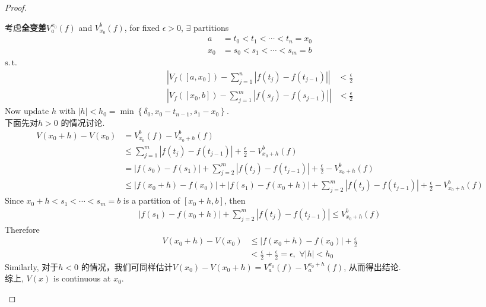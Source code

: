 \begin{proposition}
\begin{proof}
\begin{enumerate}
\begin{itemize}
					\vspace{1em}
					
					考虑\textbf{全变差}$V_{a}^{x_0}(f)$ and $V_{x_0}^{b}(f)$, for fixed $\epsilon > 0$, $\exists$ partitions
					\begin{align}
						a &= t_0 < t_1 < \cdots < t_n = x_0 \\
						x_0 &= s_0 < s_1 < \cdots < s_m = b
					\end{align}
					$\operatorname{s.t.}$
					\begin{align}
						\left| V_{f}([a , x_0]) - \sum_{j = 1}^{n}{\left| f(t_j) - f(t_{j - 1}) \right|} \right| 
						&< \frac{\epsilon}{2} \\
						\left| V_{f}([x_0 , b]) - \sum_{j = 1}^{m}{\left| f(s_j) - f(s_{j - 1}) \right|} \right| 
						&< \frac{\epsilon}{2}
					\end{align}
					Now update $h$ with $\left| h \right| < h_0 = \min{\left\{ \delta_0 , x_0 - t_{n - 1} , s_1 - x_0 \right\}}$. \\
					下面先对$h > 0$ 的情况讨论.
					\begin{align}
						V(x_0 + h) - V(x_0)
						&= V_{x_0}^{b}(f) - V_{x_0 + h}^{b}(f) \\
						&\leq \sum_{j = 1}^{m}{\left| f(t_j) - f(t_{j - 1}) \right|} + \frac{\epsilon}{2} - V_{x_0 + h}^{b}(f) \\
						&= \left| f(s_0) - f(s_1) \right| + \sum_{j = 2}^{m}{\left| f(t_j) - f(t_{j - 1}) \right|} + \frac{\epsilon}{2} - V_{x_0 + h}^{b}(f) \\
						&\leq \left| f(x_0 + h) - f(x_0) \right| + \left| f(s_1) - f(x_0 + h) \right| + \sum_{j = 2}^{m}{\left| f(t_j) - f(t_{j - 1}) \right|} + \frac{\epsilon}{2} - V_{x_0 + h}^{b}(f)
					\end{align}
					Since $x_0 + h < s_1 < \cdots < s_m = b$ is a partition of $[x_0 + h , b]$, then
					\begin{align}
						\left| f(s_1) - f(x_0 + h) \right| + \sum_{j = 2}^{m}{\left| f(t_j) - f(t_{j - 1}) \right|}
						\leq V_{x_0 + h}^{b}(f)
					\end{align}
					Therefore
					\begin{align}
						V(x_0 + h) - V(x_0)
						&\leq \left| f(x_0 + h) - f(x_0) \right| + \frac{\epsilon}{2} \\
						&< \frac{\epsilon}{2} + \frac{\epsilon}{2}
						= \epsilon , \,\, \forall \left| h \right| < h_0
					\end{align}
					Similarly, 对于$h < 0$ 的情况，我们可同样估计$V(x_0) - V(x_0 + h) = V_{a}^{x_0}(f) - V_{a}^{x_0 + h}(f)$, 从而得出结论. \\
					综上, $V(x)$ is continuous at $x_0$.
				\end{itemize}
				

\end{enumerate}
\end{proof}
\end{proposition}
